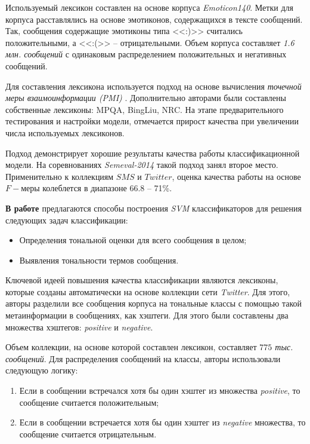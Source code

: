     Используемый лексикон составлен на основе \twitter корпуса {\it Emoticon140}.
    Метки для корпуса расставлялись на основе эмотиконов, содержащихся в
    тексте сообщений.
    Так, сообщения содержащие эмотиконы типа <<:)>> считались положительными,
    а <<:(>> -- отрицательными.
    Объем корпуса составляет {\it 1.6 млн. сообщений} с одинаковым распределением
    положительных и негативных сообщений.

    Для составления лексикона используется подход на основе вычисления
    {\it точечной меры взаимоинформации (PMI)}  \cite{lexiconSO}.
    Дополнительно авторами были составлены собственные лексиконы: MPQA, BingLiu, NRC.
    На этапе предварительного тестирования и настройки модели, отмечается прирост
    качества при увеличении числа используемых лексиконов.

    Подход демонстрирует хорошие результаты качества работы классификационной
    модели. На соревнованиях {\it Semeval-2014} такой подход занял второе
    место.
    Применительно к коллекциям $SMS$ и $Twitter$, оценка качества работы на
    основе $F-$меры колеблется в диапазоне 66.8 -- 71\%.

    {\bf В работе \cite{modernApproach}} предлагаются способы построения {\it SVM}
    классификаторов для решения следующих задач классификации:
    \begin{itemize}
        \item Определения тональной оценки для всего сообщения в целом;
        \item Выявления тональности термов сообщения.
    \end{itemize}

    Ключевой идеей повышения качества классификации являются лексиконы,
    которые созданы автоматически на основе коллекции сети {\it Twitter}.
    Для этого, авторы разделили все сообщения корпуса на тональные классы с
    помощью такой метаинформации в сообщениях, как хэштеги.
    Для этого были составлены два множества хэштегов: {\it positive} и
    {\it negative}.

    Объем коллекции, на основе которой составлен лексикон, составляет {\it $775$
    тыс. сообщений}. Для распределения сообщений на классы, авторы использовали
    следующую логику:
    \begin{enumerate}
        \item Если в сообщении встречался хотя бы один хэштег из множества {\it positive}, то
            сообщение считается положительным;
        \item Если в сообщении встречается хотя бы один хэштег из {\it negative} множества, то
            сообщение считается отрицательным.
    \end{enumerate}

